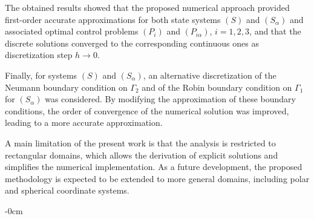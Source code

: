 \documentclass[axioms,article,submit,moreauthors]{Definitions/mdpi}
\begin{document}
The obtained results showed that the proposed numerical approach provided first-order accurate approximations for both state systems $(S)$ and $(S_\alpha)$ and associated optimal control problems $(P_i)$ and $(P_{i\alpha})$, $i=1,2,3$, and that the discrete solutions converged to the corresponding continuous ones as discretization step $h \to 0$.

Finally, for systems $(S)$ and $(S_\alpha)$, an alternative discretization of the Neumann boundary condition on $\Gamma_2$ and of the Robin boundary condition on $\Gamma_1$ for $(S_\alpha)$ was considered. By modifying the approximation of these boundary conditions, the order of convergence of the numerical solution was improved, leading to a more accurate approximation.

A main limitation of the present work is that the analysis is restricted to rectangular domains, which allows the derivation of explicit solutions and simplifies the numerical implementation. As a future development, the proposed methodology is expected to be extended to more general domains, including polar and spherical coordinate systems.

\vspace{6pt}









\begin{adjustwidth}{-\extralength}{0cm}




\PublishersNote{}
\end{adjustwidth}
\end{document}
